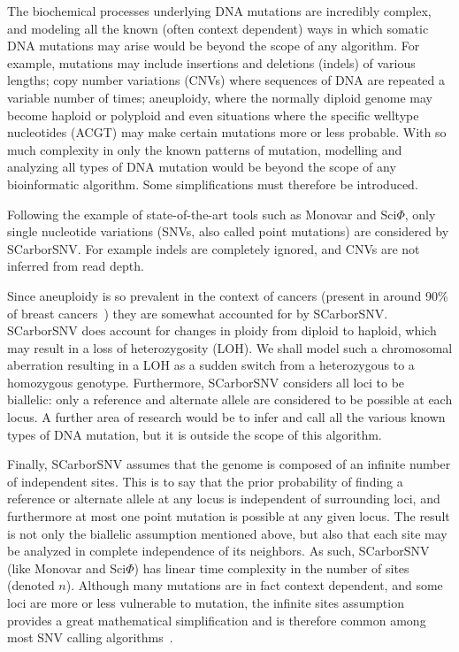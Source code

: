 \documentclass[../../main.tex]{subfiles}
\begin{document}
The biochemical processes underlying DNA mutations are incredibly complex, and modeling all the known (often context dependent) ways in which somatic DNA mutations may arise would be beyond the scope of any algorithm.
For example, mutations may include insertions and deletions (indels) of various lengths; copy number variations (CNVs) where sequences of DNA are repeated a variable number of times; aneuploidy, where the normally diploid genome may become haploid or polyploid and even situations where the specific welltype nucleotides (ACGT) may make certain mutations more or less probable\cite{monovar, 21breasts, 21breasts2, metastatic, gao2016punctuated}.
With so much complexity in only the known patterns of mutation, modelling and analyzing all types of DNA mutation would be beyond the scope of any bioinformatic algorithm.
Some simplifications must therefore be introduced.

Following the example of state-of-the-art tools such as Monovar and Sci$\Phi$, only single nucleotide variations (SNVs, also called point mutations) are considered by SCarborSNV.
For example indels are completely ignored, and CNVs are not inferred from read depth.

Since aneuploidy is so prevalent in the context of cancers (present in around 90\% of breast cancers~\cite{gao2016punctuated}) they are somewhat accounted for by SCarborSNV.
SCarborSNV does account for changes in ploidy from diploid to haploid, which may result in a loss of heterozygosity (LOH).
We shall model such a chromosomal aberration resulting in a LOH as a sudden switch from a heterozygous to a homozygous genotype.
Furthermore, SCarborSNV considers all loci to be biallelic: only a reference and alternate allele are considered to be possible at each locus.
A further area of research would be to infer and call all the various known types of DNA mutation, but it is outside the scope of this algorithm.

Finally, SCarborSNV assumes that the genome is composed of an infinite number of independent sites.
This is to say that the prior probability of finding a reference or alternate allele at any locus is independent of surrounding loci, and furthermore at most one point mutation is possible at any given locus.
The result is not only the biallelic assumption mentioned above, but also that each site may be analyzed in complete independence of its neighbors.
As such, SCarborSNV (like Monovar and Sci$\Phi$) has linear time complexity in the number of sites (denoted $n$).
Although many mutations are in fact context dependent, and some loci are more or less vulnerable to mutation, the infinite sites assumption provides a great mathematical simplification and is therefore common among most SNV calling algorithms~\cite{greenman2007patterns, 21breasts2, alexandrov2013signatures}.
\end{document}
